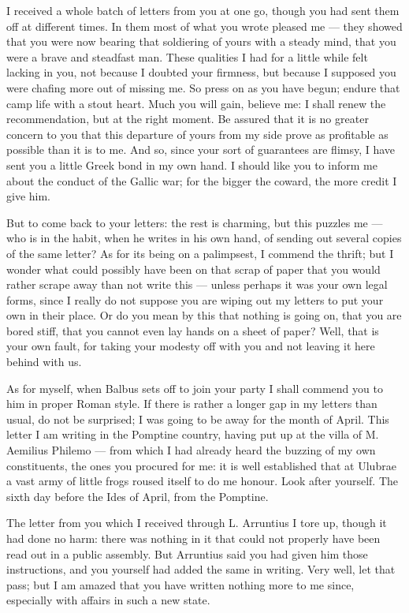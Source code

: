 

 I received a whole batch of letters from you at one go, though you had sent them off at different times. In them most of what you wrote pleased me --- they showed that you were now bearing that soldiering of yours with a steady mind, that you were a brave and steadfast man. These qualities I had for a little while felt lacking in you, not because I doubted your firmness, but because I supposed you were chafing more out of missing me. So press on as you have begun; endure that camp life with a stout heart. Much you will gain, believe me: I shall renew the recommendation, but at the right moment. Be assured that it is no greater concern to you that this departure of yours from my side prove as profitable as possible than it is to me. And so, since your sort of guarantees are flimsy, I have sent you a little Greek bond in my own hand. I should like you to inform me about the conduct of the Gallic war; for the bigger the coward, the more credit I give him.

 But to come back to your letters: the rest is charming, but this puzzles me --- who is in the habit, when he writes in his own hand, of sending out several copies of the same letter? As for its being on a palimpsest, I commend the thrift; but I wonder what could possibly have been on that scrap of paper that you would rather scrape away than not write this --- unless perhaps it was your own legal forms, since I really do not suppose you are wiping out my letters to put your own in their place. Or do you mean by this that nothing is going on, that you are bored stiff, that you cannot even lay hands on a sheet of paper? Well, that is your own fault, for taking your modesty off with you and not leaving it here behind with us.

 As for myself, when Balbus sets off to join your party I shall commend you to him in proper Roman style. If there is rather a longer gap in my letters than usual, do not be surprised; I was going to be away for the month of April. This letter I am writing in the Pomptine country, having put up at the villa of M. Aemilius Philemo --- from which I had already heard the buzzing of my own constituents, the ones you procured for me: it is well established that at Ulubrae a vast army of little frogs roused itself to do me honour. Look after yourself. The sixth day before the Ides of April, from the Pomptine.

 The letter from you which I received through L. Arruntius I tore up, though it had done no harm: there was nothing in it that could not properly have been read out in a public assembly. But Arruntius said you had given him those instructions, and you yourself had added the same in writing. Very well, let that pass; but I am amazed that you have written nothing more to me since, especially with affairs in such a new state.
